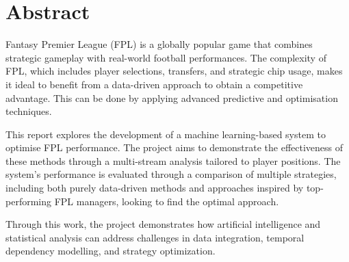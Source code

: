 \chapter*{\Large \center Abstract}


Fantasy Premier League (FPL) is a globally popular game that combines strategic gameplay with real-world football performances. The complexity of FPL, which includes player selections, transfers, and strategic chip usage, makes it ideal to benefit from a data-driven approach to obtain a competitive advantage. This can be done by applying advanced predictive and optimisation techniques.

This report explores the development of a machine learning-based system to optimise FPL performance. The project aims to demonstrate the effectiveness of these methods through a multi-stream analysis tailored to player positions. The system's performance is evaluated through a comparison of multiple strategies, including both purely data-driven methods and approaches inspired by top-performing FPL managers, looking to find the optimal approach.

Through this work, the project demonstrates how artificial intelligence and statistical analysis can address challenges in data integration, temporal dependency modelling, and strategy optimization.